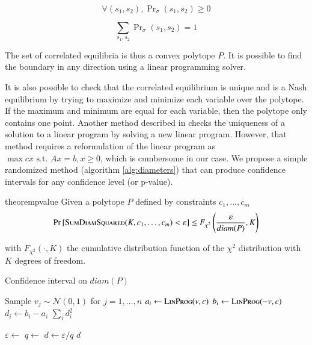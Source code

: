 \documentclass[preprint,12pt,authoryear,doubleblind]{elsarticle}
\theoremstyle{definition}
\begin{document}
$$\forall (s_1, s_2), \Pr\nolimits_\sigma(s_1, s_2) \ge 0$$

$$\sum_{s_1,s_2} \Pr\nolimits_\sigma(s_1, s_2) = 1$$


The set of correlated equilibria is thus a convex polytope $P$. It is possible to find the boundary in any direction using a linear programming solver.

It is also possible to check that the correlated equilibrium is unique and is a Nash equilibrium by trying to maximize and minimize each variable over the polytope. If the maximum and minimum are equal for each variable, then the polytope only contains one point. Another method described in \citet{appa2002uniqueness} checks the uniqueness of a solution to a linear program by solving a new linear program. However, that method requires a reformulation of the linear program as $\max cx \text{ s.t. } Ax=b, x \ge 0$, which is cumbersome in our case. We propose a simple randomized method (algorithm \ref{alg:diameters}) that can produce confidence intervals for any confidence level (or p-value).

\begin{restatable}{theorem}{pvalue}
\label{thm:pvalue}
Given a polytope $P$ defined by constraints $c_1, \ldots, c_m$
 $$
        \Pr\left[\textsc{SumDiamSquared}(K, c_1, \ldots, c_m) < \varepsilon\right] \le F_{\chi^2}\left(\frac{\varepsilon}{diam(P)}, K\right)
   $$

   with $F_{\chi^2}(\cdot, K)$ the cumulative distribution function of the $\chi^2$ distribution with $K$ degrees of freedom.
\end{restatable}

\begin{algorithm}
\label{alg:diameters}
\caption{Confidence interval on $diam(P)$}
\begin{algorithmic}
    \State Sample $v_j \sim \mathcal{N}(0, 1)$ for $j=1,\ldots,n$
    \State $a_i \gets \textsc{LinProg}(v, c)$ 
    \State $b_i \gets \textsc{LinProg}(-v, c)$ 
    \State $d_i \gets b_i - a_i$
\EndFor
\State \Return $\sum_i d_i^2$
\EndFunction
{}

\State $\varepsilon \gets$ 
\State $q \gets$ 
\State $d \gets \varepsilon / q$
\State \Return $d$
\EndFunction
\end{algorithmic}
\end{algorithm}
\end{document}
